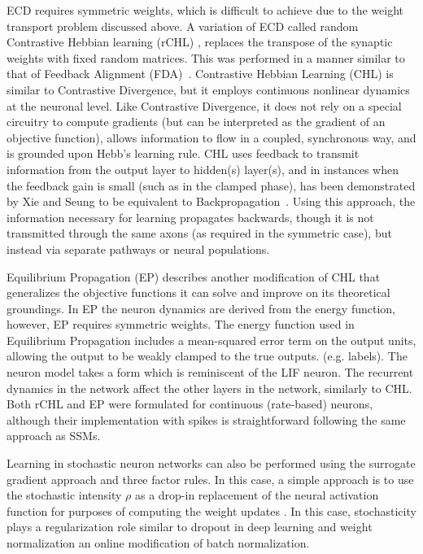 \documentclass[english]{article}
\renewcommand{\cite}{\citep}
\begin{document}
ECD requires symmetric weights, which is difficult to achieve due to the weight transport problem discussed above. 
A variation of ECD called random Contrastive Hebbian learning (rCHL) \cite{Detorakis_etal18_conthebb}, replaces the transpose of the synaptic weights with fixed random matrices. 
This was performed in a manner similar to that of Feedback Alignment (FDA)~\cite{Lillicrap_etal16_randsyna}. 
Contrastive Hebbian Learning (CHL) is similar to Contrastive Divergence, but it employs continuous nonlinear dynamics at the neuronal level.
Like Contrastive Divergence, it does not rely on a special circuitry to compute gradients (but can be interpreted as the gradient of an objective function), allows information to flow in a coupled, synchronous way, and is grounded upon Hebb's learning rule. 
CHL uses feedback to transmit information from the output layer to hidden(s) layer(s), and in instances when the feedback gain is small (such as in the clamped phase), has been demonstrated by Xie and Seung to be equivalent to Backpropagation~\cite{Xie_Seung03_equiback}.
Using this approach, the information necessary for learning propagates backwards, though it is not transmitted through the same axons (as required in the symmetric case), but instead via separate pathways or neural populations.

Equilibrium Propagation (EP) describes another modification of CHL that generalizes the objective functions it can solve and improve on its theoretical groundings.
In EP the neuron dynamics are derived from the energy function, however, EP requires symmetric weights. 
The energy function used in Equilibrium Propagation includes a mean-squared error term on the output units, allowing the output to be weakly clamped to the true outputs. (e.g. labels). 
The neuron model takes a form which is reminiscent of the \ac{LIF} neuron. The recurrent dynamics in the network affect the other layers in the network, similarly to CHL. 
Both rCHL and EP were formulated for continuous (rate-based) neurons, although their implementation with spikes is straightforward following the same approach as \acp{SSM}.

Learning in stochastic neuron networks can also be performed using the surrogate gradient approach and three factor rules. 
In this case, a simple approach is to use the stochastic intensity $\rho$ as a drop-in replacement of the neural activation function for purposes of computing the weight updates \cite{Neftci_etal19_surrgrad}.
In this case, stochasticity plays a regularization role similar to dropout in deep learning \cite{Neftci_etal17_evenranda} and weight normalization \cite{Neftci17_stocsyna} an online modification of batch normalization.
\end{document}
